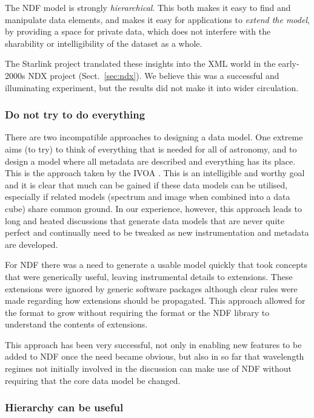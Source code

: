 \documentclass[final,authoryear,5p,times,twocolumn]{elsarticle}
\newcommand*\secref[1]{Sect.~\ref{#1}}
\begin{document}
The NDF model is strongly \emph{hierarchical}.  This both makes it
easy to find and manipulate data elements, and makes it easy for
applications to \emph{extend the model}, by providing a space for
private data, which does not interfere with the sharability or
intelligibility of the dataset as a whole.

The Starlink project translated these insights into the XML world in
the early-2000s NDX project (\secref{sec:ndx}).  We believe this was a
successful and illuminating experiment, but the results did not make
it into wider circulation.

\subsubsection{Do not try to do everything}

There are two incompatible approaches to designing a data model. One
extreme aims (to try) to think of everything that is needed for
all of astronomy, and to design a model where all metadata are
described and everything has its place. This is the approach taken by
the IVOA \citep[see e.g.][]{2012arXiv1204.3055M}. This is an
intelligible and worthy goal and it is clear that
much can be gained if these data models can be utilised, especially if
related models (spectrum and image when combined into a data cube)
share common ground.  In our experience, however, this approach leads to long and
heated discussions that generate data models that are never quite
perfect and continually need to be tweaked as new instrumentation and
metadata are developed.

For NDF there was a need to generate a usable model quickly that took
concepts that were generically useful, leaving instrumental details to
extensions. These extensions were ignored by generic software packages
although clear rules were made regarding how extensions should be
propagated. This approach allowed for the format to grow without
requiring the format or the NDF library to understand the
contents of extensions.

This approach has been very successful, not only in enabling new
features to be added to NDF once the need became obvious, but also
in so far that wavelength regimes not initially involved in the
discussion can make use of NDF without requiring that the core data
model be changed.

\subsubsection{Hierarchy can be useful}
\end{document}
